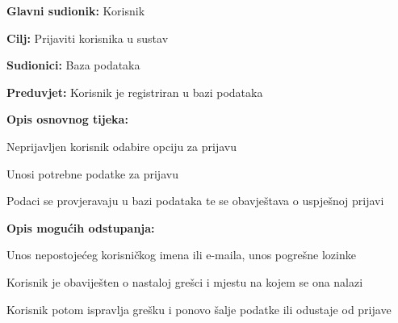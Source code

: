					\noindent {}
				\begin{packed_item}
					
					\item \textbf{Glavni sudionik: }Korisnik
					\item  \textbf{Cilj:} Prijaviti korisnika u sustav
					\item  \textbf{Sudionici:} Baza podataka
					\item  \textbf{Preduvjet:} Korisnik je registriran u bazi podataka
					\item  \textbf{Opis osnovnog tijeka:}
						
					\item[] \begin{packed_enum}
							
						\item Neprijavljen korisnik odabire opciju za prijavu
						\item Unosi potrebne podatke za prijavu
						\item Podaci se provjeravaju u bazi podataka te se obavještava o uspješnoj prijavi
					\end{packed_enum}
						
					\item  \textbf{Opis mogućih odstupanja:}
						
					\item[] \begin{packed_item}
							
						\item[2.a] Unos nepostojećeg korisničkog imena ili e-maila, unos pogrešne lozinke
						\item[] \begin{packed_enum}
								
							\item Korisnik je obaviješten o nastaloj grešci i mjestu na kojem se ona nalazi
							\item Korisnik potom ispravlja grešku i ponovo šalje podatke ili odustaje od prijave
								
						\end{packed_enum}					
					\end{packed_item}
				\end{packed_item}
				
